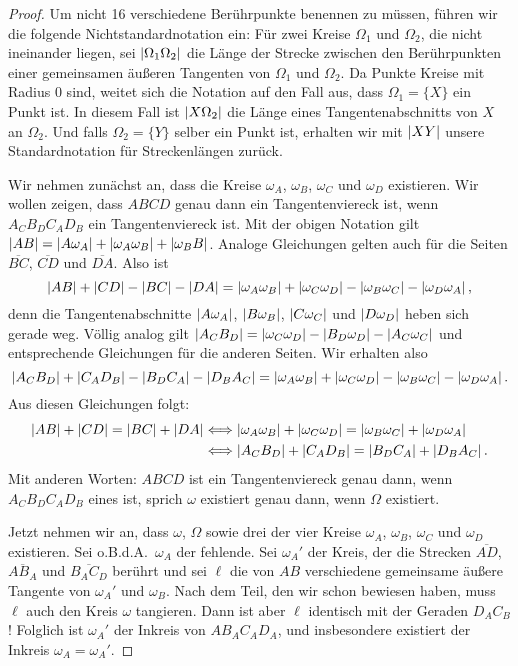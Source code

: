 \begin{proof}
	Um nicht 16 verschiedene Berührpunkte benennen zu müssen, führen wir die folgende Nichtstandardnotation ein: Für zwei Kreise $\Omega_1$ und $\Omega_2$, die nicht ineinander liegen, sei $\lvert\Omega_1\Omega_2\rvert$ die Länge der Strecke zwischen den Berührpunkten einer gemeinsamen äußeren Tangenten von $\Omega_1$ und $\Omega_2$. Da Punkte Kreise mit Radius $0$ sind, weitet sich die Notation auf den Fall aus, dass $\Omega_1=\{X\}$ ein Punkt ist. In diesem Fall ist $\lvert X\Omega_2\rvert$ die Länge eines Tangentenabschnitts von $X$ an $\Omega_2$. Und falls $\Omega_2=\{Y\}$ selber ein Punkt ist, erhalten wir mit $\lvert XY\rvert$ unsere Standardnotation für Streckenlängen zurück.
	
	Wir nehmen zunächst an, dass die Kreise $\omega_A$, $\omega_B$, $\omega_C$ und $\omega_D$ existieren. Wir wollen zeigen, dass $ABCD$ genau dann ein Tangentenviereck ist, wenn $A_CB_DC_AD_B$ ein Tangentenviereck ist. Mit der obigen Notation gilt $\lvert AB\rvert=\lvert A\omega_A\rvert+\lvert\omega_A\omega_B\rvert+\lvert\omega_BB\rvert$. Analoge Gleichungen gelten auch für die Seiten $\overline{BC}$, $\overline{CD}$ und $\overline{DA}$. Also ist
	\begin{equation*}
		\lvert AB\rvert+\lvert CD\rvert-\lvert BC\rvert-\lvert DA\rvert=\lvert\omega_A\omega_B\rvert+\lvert\omega_C\omega_D\rvert-\lvert\omega_B\omega_C\rvert-\lvert\omega_D\omega_A\rvert\,,
	\end{equation*}
	denn die Tangentenabschnitte $\lvert A\omega_A\rvert$, $\lvert B\omega_B\rvert$, $\lvert C\omega_C\rvert$ und $\lvert D\omega_D\rvert$ heben sich gerade weg. Völlig analog gilt $\lvert A_CB_D\rvert=\lvert\omega_C\omega_D\rvert-\lvert B_D\omega_D\rvert-\lvert A_C\omega_C\rvert$ und entsprechende Gleichungen für die anderen Seiten. Wir erhalten also 
	\begin{equation*}
		\lvert A_CB_D\rvert+\lvert C_AD_B\rvert-\lvert B_DC_A\rvert-\lvert D_BA_C\rvert=\lvert\omega_A\omega_B\rvert+\lvert\omega_C\omega_D\rvert-\lvert\omega_B\omega_C\rvert-\lvert\omega_D\omega_A\rvert\,.
	\end{equation*}
	Aus diesen Gleichungen folgt:
	\begin{align*}
		\lvert AB\rvert+\lvert CD\rvert=\lvert BC\rvert+\lvert DA\rvert&\Longleftrightarrow \lvert\omega_A\omega_B\rvert+\lvert\omega_C\omega_D\rvert=\lvert\omega_B\omega_C\rvert+\lvert\omega_D\omega_A\rvert\\
		&\Longleftrightarrow \lvert A_CB_D\rvert+\lvert C_AD_B\rvert=\lvert B_DC_A\rvert+\lvert D_BA_C\rvert\,.
	\end{align*}
	Mit anderen Worten: $ABCD$ ist ein Tangentenviereck genau dann, wenn $A_CB_DC_AD_B$ eines ist, sprich $\omega$ existiert genau dann, wenn $\Omega$ existiert.
	
	Jetzt nehmen wir an, dass $\omega$, $\Omega$ sowie drei der vier Kreise $\omega_A$, $\omega_B$, $\omega_C$ und $\omega_D$ existieren. Sei o.B.d.A.\ $\omega_A$ der fehlende. Sei $\omega_A'$ der Kreis, der die Strecken $\overline{AD}$, $\overline{AB_A}$ und $\overline{B_AC_D}$ berührt und sei $\ell$ die von $AB$ verschiedene gemeinsame äußere Tangente von $\omega_A'$ und $\omega_B$. Nach dem Teil, den wir schon bewiesen haben, muss $\ell$ auch den Kreis $\omega$ tangieren. Dann ist aber $\ell$ identisch mit der Geraden $D_AC_B$! Folglich ist $\omega_A'$ der Inkreis von $AB_AC_AD_A$, und insbesondere existiert der Inkreis $\omega_A=\omega_A'$.
\end{proof}

